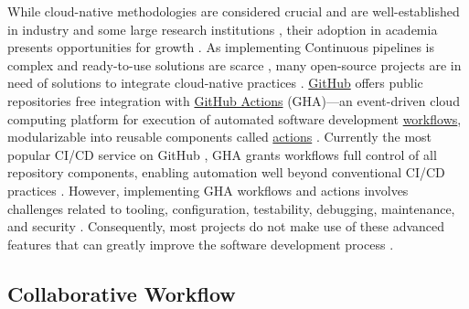 \documentclass{article}
\begin{document}
While cloud-native methodologies are considered crucial \cite{EffectsOfCIOnSoftDev, CICDSystematicReview, AnalysisOfTrendsInProductivity} and are well-established in industry \cite{EmpEvAgile, AgileAdoptionSurvey, Top10AdagesInCD, SynthCDPractices} and some large research institutions \cite{IntroducingAgileInBioInf, AgileInBioMedSoftDev, UsingAgileToDevCompBioSoft, ExploringXPForSciRes}, their adoption in academia presents opportunities for growth \cite{SurveySEPracticesInScience2, SelfPerceptions, AdoptingSoftEngConceptsInSciResearch, DevelopingSciSoft}. As implementing Continuous pipelines is complex and ready-to-use solutions are scarce \cite{ModelingCI, CICDSystematicReview, UncoveringBenefitsAndChallengesOfCI, StairwayToHeaven, CDHugeBenefits, HowDoSoftDevsUseGHA, DevPerceptionOfGHA, EffectsOfCIOnSoftDev}, many open-source projects are in need of solutions to integrate cloud-native practices \cite{CITheater, AutoSecurityAssessOfGHAWorkflows, AmbushFromAllSides, OnOutdatednessOfWorkflowsInGHA}. \href{https://github.com}{GitHub} offers public repositories free integration with \href{https://github.com/features/actions}{GitHub Actions} (GHA)—an event-driven cloud computing platform for execution of automated software development \href{https://docs.github.com/en/actions/using-workflows/about-workflows}{workflows}, modularizable into reusable components called \href{https://docs.github.com/en/actions/creating-actions/about-custom-actions}{actions} \cite{GitHubDevWorkflowAutoEcoBook, HandsOnGHA}. Currently the most popular CI/CD service on GitHub \cite{RiseAndFallOfCIinGH, OnUsageAndMigrationOfCITools, OnUseOfGHA}, GHA grants workflows full control of all repository components, enabling automation well beyond conventional CI/CD practices \cite{DevPerceptionOfGHA, GitHubDevWorkflowAutoEcoBook}. However, implementing GHA workflows and actions involves challenges related to tooling, configuration, testability, debugging, maintenance, and security \cite{HowDoSoftDevsUseGHA, EvolutionOfGHAWorkflows, OnOutdatednessOfWorkflowsInGHA, AutoSecurityAssessOfGHAWorkflows}. Consequently, most projects do not make use of these advanced features that can greatly improve the software development process \cite{OnUseOfGHA, LetsSuperchargeWorkflows}.

\subsection{Collaborative Workflow}
\end{document}
